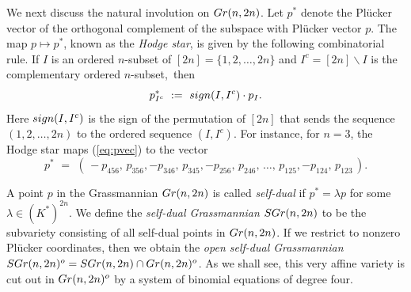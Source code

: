 \documentclass[12pt]{extarticle}
\theoremstyle{definition}
\numberwithin{theorem}{section}
\theoremstyle{plain}\newtheorem{ithm}{Theorem}
\begin{document}
We next discuss the natural involution on ${\rm Gr}(n,2n)$.
Let $p^*$ denote the Pl\"ucker vector of the orthogonal complement
of the subspace with Pl\"ucker vector $p$. The map $p \mapsto p^*$,
known  as the {\em Hodge star},
 is given by the following combinatorial rule.
If $I$ is an ordered $n$-subset of $[2n] = \{1,2,\ldots,2n\}$ and
$I^c = [2n] \backslash I$ is the complementary ordered $n$-subset,~then
\begin{equation}
\label{eq:hodgestar}
 p^*_{I^c} \,\, := \,\, {\rm sign}(I,I^c) \cdot p_I. 
 \end{equation}
Here ${\rm sign}(I,I^c)$ is the sign of the permutation of $[2n]$
that sends the sequence $(1,2,\ldots,2n)$ to  the ordered sequence $(I,I^c)$.
For instance, for $n{=}3$, the Hodge star maps (\ref{eq:pvec}) to the vector
  \begin{equation}
 \label{eq:pvecdual}
 p^* \,\,= \,\,(  \,-p_{456},  \,p_{356}, -p_{346},\,p_{345},-p_{256}, \,p_{246},\,\ldots,\, p_{125}, -p_{124},\, p_{123}\,) .
 \end{equation}
 
 A point $p$ in the Grassmannian ${\rm Gr}(n,2n)$ is called {\em self-dual}
 if $p^* = \lambda p$ for some $\lambda \in (K^*)^{2n}$.
  We define the
 {\em self-dual Grassmannian}  ${\rm SGr}(n,2n)$ to be the subvariety consisting
 of all self-dual points in
 ${\rm Gr}(n,2n)$.   If we restrict to nonzero Pl\"ucker coordinates,
then we obtain the {\em open self-dual Grassmannian}
 ${\rm SGr}(n,2n)^o = {\rm SGr}(n,2n) \cap {\rm Gr}(n,2n)^o$.
 As we shall see, this very affine variety is cut out in ${\rm Gr}(n,2n)^o$
 by a system of binomial equations of degree four.
 
\end{document}
